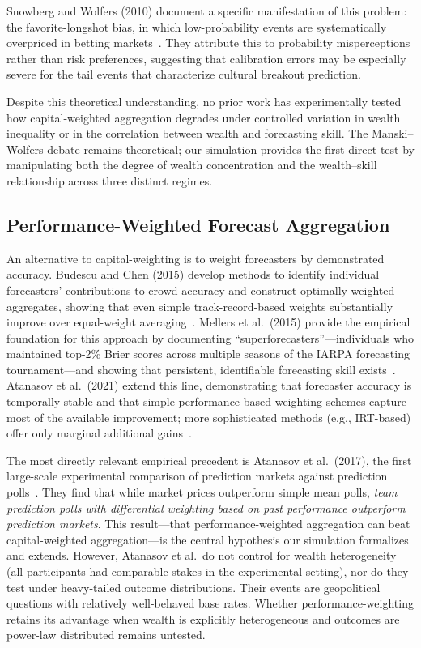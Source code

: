 \documentclass[conference]{IEEEtran}
\begin{document}
Snowberg and Wolfers (2010) document a specific manifestation of this problem: the favorite-longshot bias, in which low-probability events are systematically overpriced in betting markets~\cite{snowberg2010}. They attribute this to probability misperceptions rather than risk preferences, suggesting that calibration errors may be especially severe for the tail events that characterize cultural breakout prediction.

Despite this theoretical understanding, no prior work has experimentally tested how capital-weighted aggregation degrades under controlled variation in wealth inequality or in the correlation between wealth and forecasting skill. The Manski--Wolfers debate remains theoretical; our simulation provides the first direct test by manipulating both the degree of wealth concentration and the wealth--skill relationship across three distinct regimes.

\subsection{Performance-Weighted Forecast Aggregation}
\label{sec:related-aggregation}

An alternative to capital-weighting is to weight forecasters by demonstrated accuracy. Budescu and Chen (2015) develop methods to identify individual forecasters' contributions to crowd accuracy and construct optimally weighted aggregates, showing that even simple track-record-based weights substantially improve over equal-weight averaging~\cite{budescu2015}. Mellers et al.\ (2015) provide the empirical foundation for this approach by documenting ``superforecasters''---individuals who maintained top-2\% Brier scores across multiple seasons of the IARPA forecasting tournament---and showing that persistent, identifiable forecasting skill exists~\cite{mellers2015}. Atanasov et al.\ (2021) extend this line, demonstrating that forecaster accuracy is temporally stable and that simple performance-based weighting schemes capture most of the available improvement; more sophisticated methods (e.g., IRT-based) offer only marginal additional gains~\cite{atanasov2021}.

The most directly relevant empirical precedent is Atanasov et al.\ (2017), the first large-scale experimental comparison of prediction markets against prediction polls~\cite{atanasov2017}. They find that while market prices outperform simple mean polls, \emph{team prediction polls with differential weighting based on past performance outperform prediction markets}. This result---that performance-weighted aggregation can beat capital-weighted aggregation---is the central hypothesis our simulation formalizes and extends. However, Atanasov et al.\ do not control for wealth heterogeneity (all participants had comparable stakes in the experimental setting), nor do they test under heavy-tailed outcome distributions. Their events are geopolitical questions with relatively well-behaved base rates. Whether performance-weighting retains its advantage when wealth is explicitly heterogeneous and outcomes are power-law distributed remains untested.
\end{document}

